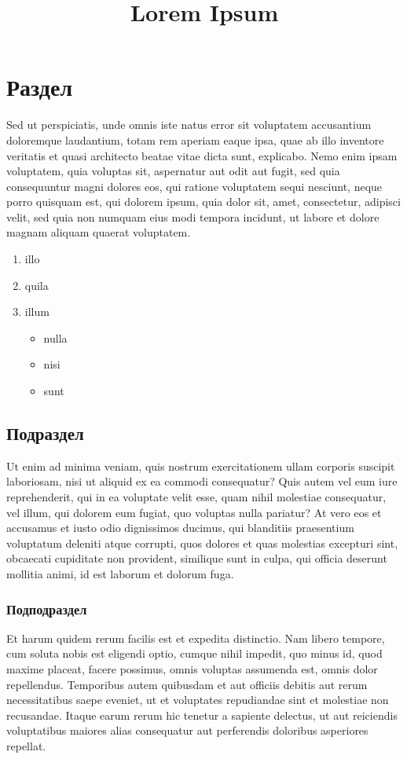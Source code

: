 \documentclass{article}
\title{Lorem Ipsum}
\date{ }
\begin{document}
	\maketitle
	\tableofcontents
	\section{Раздел}
	Sed ut perspiciatis, unde omnis iste natus error sit voluptatem accusantium doloremque laudantium, totam rem aperiam eaque ipsa, quae ab illo inventore veritatis et quasi\cite{50} architecto beatae vitae dicta sunt, explicabo. Nemo enim ipsam voluptatem, quia voluptas sit, aspernatur aut odit aut fugit, sed quia consequuntur magni dolores eos, qui ratione voluptatem sequi nesciunt, neque porro quisquam est, qui dolorem ipsum, quia dolor sit, amet, consectetur, adipisci velit, sed quia non numquam eius modi tempora incidunt, ut labore et dolore magnam aliquam quaerat voluptatem.
	\begin{enumerate}
		\item illo
		\item quila
		\item illum
		\begin{itemize}
			\item nulla
			\item nisi
			\item sunt
		\end{itemize}
	\end{enumerate}
	
	\subsection{Подраздел}
	Ut enim ad minima veniam, quis nostrum exercitationem\cite{10} ullam\cite{40} corporis suscipit laboriosam, nisi ut aliquid ex ea commodi consequatur? Quis autem vel eum iure reprehenderit, qui in ea voluptate velit esse, quam nihil molestiae consequatur, vel illum, qui dolorem eum fugiat, quo voluptas nulla pariatur? At vero eos et accusamus et iusto odio dignissimos ducimus, qui blanditiis praesentium voluptatum deleniti atque corrupti, quos dolores et quas molestias excepturi sint, obcaecati cupiditate non provident, similique sunt in culpa, qui officia deserunt mollitia animi, id est laborum et dolorum fuga.
	\subsubsection{Подподраздел}
	Et harum quidem rerum facilis est et expedita distinctio. Nam\cite{30} libero tempore\cite{20}, cum soluta nobis est eligendi optio, cumque nihil impedit, quo minus id, quod maxime placeat, facere possimus, omnis voluptas assumenda est, omnis dolor repellendus. Temporibus autem quibusdam et aut officiis debitis aut rerum necessitatibus saepe eveniet, ut et voluptates repudiandae sint et molestiae non recusandae. Itaque earum rerum hic tenetur\cite{50} a sapiente delectus, ut aut reiciendis voluptatibus maiores alias consequatur aut perferendis doloribus asperiores repellat.
	
\end{document}

